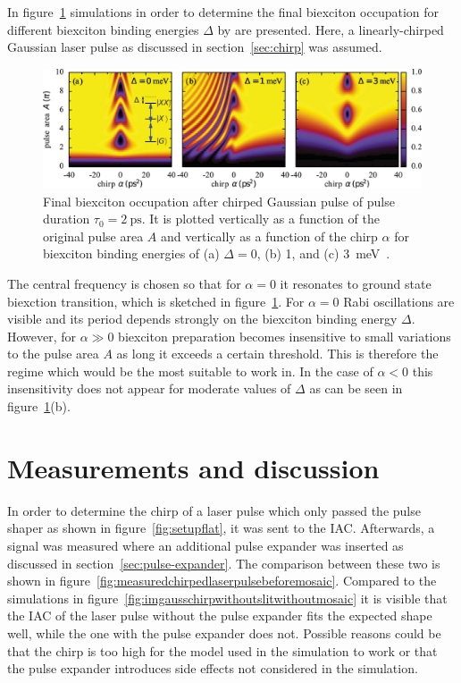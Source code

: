 In figure~\ref{fig:biexciton-occupation} simulations in order to determine the final biexciton occupation for different biexciton binding energies $\Delta$ by \textcite{glassl_biexciton_2013} are presented.
Here, a linearly-chirped Gaussian laser pulse as discussed in section~\ref{sec:chirp} was assumed.
\begin{figure}[H]
	\centering
	\includegraphics[width=\linewidth]{figures/chirp/biexciton-occupation}
	\caption[Final biexciton occupation after chirped Gaussian pulse of pulse duration $\tau_0 = \SI{2}{\pico \second}$]{Final biexciton occupation after chirped Gaussian pulse of pulse duration $\tau_0 = \SI{2}{\pico \second}$.
		It is plotted vertically as a function of the original pulse area $A$ and vertically as a function of the chirp $\alpha$ for biexciton binding energies of (a) $\Delta=0$, (b) 1, and (c) \SI{3}{\milli \electronvolt}~\cite{glassl_biexciton_2013}.}
	\label{fig:biexciton-occupation}
\end{figure}
The central frequency is chosen so that for $\alpha=0$ it resonates to ground state biexction transition, which is sketched in figure~\ref{fig:biexciton-occupation}.
For $\alpha=0$ Rabi oscillations are visible and its period depends strongly on the biexciton binding energy $\Delta$.
However, for $\alpha \gg 0$ biexciton preparation becomes insensitive to small variations to the pulse area $A$ as long it exceeds a certain threshold.
This is therefore the regime which would be the most suitable to work in.
In the case of $\alpha < 0$ this insensitivity does not appear for moderate values of $\Delta$ as can be seen in figure~\ref{fig:biexciton-occupation}(b).

\section{Measurements and discussion}
In order to determine the chirp of a laser pulse which only passed the pulse shaper as shown in figure~\ref{fig:setupflat}, it was sent to the \ac{IAC}.
Afterwards, a signal was measured where an additional pulse expander was inserted as discussed in section~\ref{sec:pulse-expander}.
The comparison between these two is shown in figure~\ref{fig:measuredchirpedlaserpulsebeforemosaic}.
Compared to the simulations in figure~\ref{fig:imgausschirpwithoutslitwithoutmosaic} it is visible that the IAC of the laser pulse without the pulse expander fits the expected shape well, while the one with the pulse expander does not.
Possible reasons could be that the chirp is too high for the model used in the simulation to work or that the pulse expander introduces side effects not considered in the simulation.

